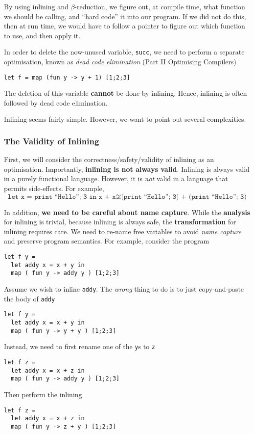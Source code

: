 By using inlining and $\beta$-reduction, we figure out, at compile time, what function we should be calling, and ``hard code'' it into our program. If we did not do this, then at run time, we would have to follow a pointer to figure out which function to use, and then apply it. 

In order to delete the now-unused variable, \texttt{succ}, we need to perform a separate optimisation, known as \textit{dead code elimination} (\textsf{Part II Optimising Compilers})
\begin{verbatim}
let f = map (fun y -> y + 1) [1;2;3]
\end{verbatim}
The deletion of this variable \textbf{cannot} be done by inlining. Hence, inlining is often followed by dead code elimination. 

Inlining seems fairly simple. However, we want to point out several complexities.

\subsubsection{The Validity of Inlining}
First, we will consider the correctness/safety/validity of inlining as an optimisation. Importantly, \textbf{inlining is not always valid}. Inlining is always valid in a purely functional language. However, it is \textit{not} valid in a language that permits side-effects. For example, 
\[\texttt{let x = print ``Hello''; 3 in x + x} \not\cong \texttt{(print ``Hello''; 3) + (print ``Hello''; 3)}  \]

In addition, \textbf{we need to be careful about name capture}. While the \textbf{analysis} for inlining is trivial, because inlining is always safe, the \textbf{transformation} for inlining requires care. We need to re-name free variables to avoid \textit{name capture} and preserve program semantics. For example, consider the program
\begin{verbatim}
let f y =
  let addy x = x + y in
  map ( fun y -> addy y ) [1;2;3]
\end{verbatim}
Assume we wish to inline \texttt{addy}. The \textit{wrong} thing to do is to just copy-and-paste the body of \texttt{addy}
\begin{verbatim}
let f y =
  let addy x = x + y in
  map ( fun y -> y + y ) [1;2;3]
\end{verbatim}
Instead, we need to first rename one of the \texttt{y}s to \texttt{z}
\begin{verbatim}
let f z =
  let addy x = x + z in
  map ( fun y -> addy y ) [1;2;3]
\end{verbatim}
Then perform the inlining
\begin{verbatim}
let f z =
  let addy x = x + z in
  map ( fun y -> z + y ) [1;2;3]
\end{verbatim}


